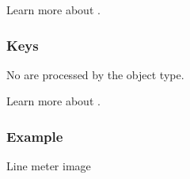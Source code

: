 \documentclass[letterpaper,10pt,english]{sphinxmanual}
\begin{document}
Learn more about {\hyperref[\detokenize{overview/events::doc}]{}}.


\subsubsection{Keys}
\label{\detokenize{object-types/lmeter:keys}}
No  are processed by the object type.

Learn more about {\hyperref[\detokenize{overview/indev::doc}]{}}.


\subsubsection{Example}
\label{\detokenize{object-types/lmeter:example}}
Line meter image
\end{document}
